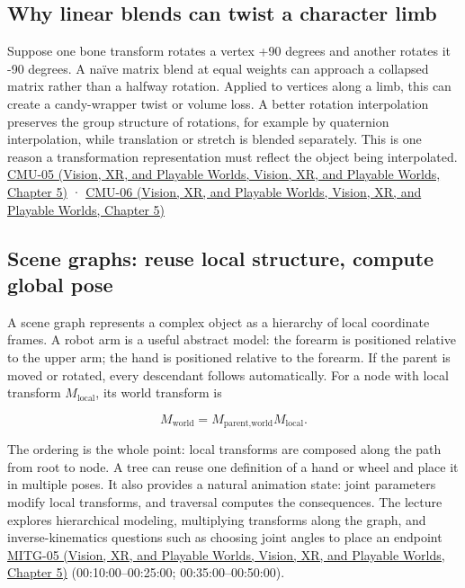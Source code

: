 \subsection{Why linear blends can twist a character limb}\label{04-visual-computing-ii-ch029-why-linear-blends-can-twist-a-character-limb}

Suppose one bone transform rotates a vertex +90 degrees and another rotates it -90 degrees. A naïve matrix blend at equal weights can approach a collapsed matrix rather than a halfway rotation. Applied to vertices along a limb, this can create a candy-wrapper twist or volume loss. A better rotation interpolation preserves the group structure of rotations, for example by quaternion interpolation, while translation or stretch is blended separately. This is one reason a transformation representation must reflect the object being interpolated. \href{../07-Vision-XR-and-Playable-Worlds/main.pdf\#nameddest=04-visual-computing-ii-ch036-cmu-05---spatial-transformations}{CMU-05 (Vision, XR, and Playable Worlds, Vision, XR, and Playable Worlds, Chapter 5)} · \href{../07-Vision-XR-and-Playable-Worlds/main.pdf\#nameddest=04-visual-computing-ii-ch036-cmu-06---3d-rotations-and-complex-representations}{CMU-06 (Vision, XR, and Playable Worlds, Vision, XR, and Playable Worlds, Chapter 5)}

\subsection{Scene graphs: reuse local structure, compute global pose}\label{04-visual-computing-ii-ch029-scene-graphs-reuse-local-structure-compute-global-pose}

A scene graph represents a complex object as a hierarchy of local coordinate frames. A robot arm is a useful abstract model: the forearm is positioned relative to the upper arm; the hand is positioned relative to the forearm. If the parent is moved or rotated, every descendant follows automatically. For a node with local transform \(M_{\mathrm{local}}\), its world transform is

\[
M_{\text{world}}=M_{\text{parent,world}}M_{\text{local}}.
\]

The ordering is the whole point: local transforms are composed along the path from root to node. A tree can reuse one definition of a hand or wheel and place it in multiple poses. It also provides a natural animation state: joint parameters modify local transforms, and traversal computes the consequences. The lecture explores hierarchical modeling, multiplying transforms along the graph, and inverse-kinematics questions such as choosing joint angles to place an endpoint \href{../07-Vision-XR-and-Playable-Worlds/main.pdf\#nameddest=04-visual-computing-ii-ch036-mitg-05---hierarchical-modeling}{MITG-05 (Vision, XR, and Playable Worlds, Vision, XR, and Playable Worlds, Chapter 5)} (00:10:00--00:25:00; 00:35:00--00:50:00).

